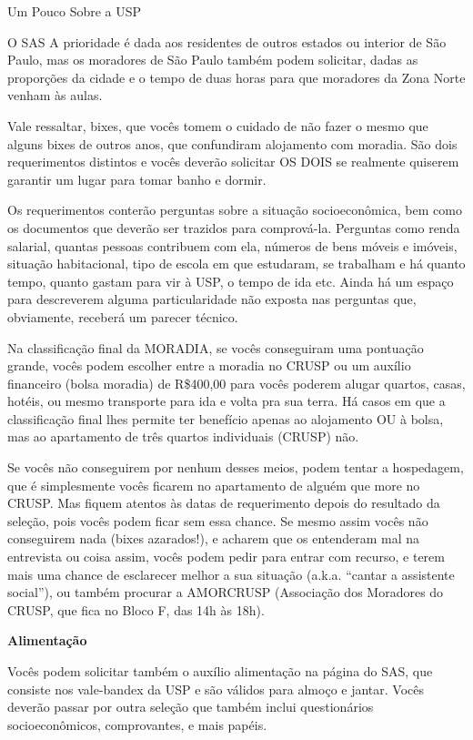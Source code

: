 \begin{secao}{Um Pouco Sobre a USP}
\begin{subsecao}{O SAS}
A prioridade é dada aos residentes de outros estados ou interior de São Paulo,
mas os moradores de São Paulo também podem solicitar, dadas as proporções da
cidade e o tempo de duas horas para que moradores da Zona Norte venham às aulas.

Vale ressaltar, bixes, que vocês tomem o cuidado de não fazer o mesmo que alguns
bixes de outros anos, que confundiram alojamento com moradia. São dois
requerimentos distintos e vocês deverão solicitar OS DOIS se realmente quiserem
garantir um lugar para tomar banho e dormir.

Os requerimentos conterão perguntas sobre a situação socioeconômica, bem como os
documentos que deverão ser trazidos para comprová-la. Perguntas como renda
salarial, quantas pessoas contribuem com ela, números de bens móveis e imóveis,
situação habitacional, tipo de escola em que estudaram, se trabalham e há quanto
tempo, quanto gastam para vir à USP, o tempo de ida etc. Ainda há um espaço
para descreverem alguma particularidade não exposta nas perguntas que, obviamente,
receberá um parecer técnico.

Na classificação final da MORADIA, se vocês conseguiram uma pontuação grande, vocês
podem escolher entre a moradia no CRUSP ou um auxílio financeiro (bolsa moradia)
de R\$400,00 para vocês poderem alugar quartos, casas, hotéis, ou mesmo transporte
para ida e volta pra sua terra. Há casos em que a classificação final lhes
permite ter benefício apenas ao alojamento OU à bolsa, mas ao apartamento de
três quartos individuais (CRUSP) não.

Se vocês não conseguirem por nenhum desses meios, podem tentar a hospedagem, que é
simplesmente vocês ficarem no apartamento de alguém que more no CRUSP. Mas fiquem
atentos às datas de requerimento depois do resultado da seleção, pois vocês podem
ficar sem essa chance. Se mesmo assim vocês não conseguirem nada (bixes azarados!),
e acharem que os entenderam mal na entrevista ou coisa assim, vocês podem pedir para
entrar com recurso, e terem mais uma chance de esclarecer melhor a sua situação
(a.k.a. “cantar a assistente social”), ou também procurar a
AMORCRUSP (Associação dos Moradores do CRUSP, que fica no Bloco F, das 14h às 18h).

{\bf Alimentação}

Vocês podem solicitar também o auxílio alimentação na página do SAS, que
consiste nos vale-bandex da USP e são válidos para almoço e jantar. Vocês deverão
passar por outra seleção que também inclui questionários socioeconômicos,
comprovantes, e mais papéis.


\end{subsecao}
\end{secao}
